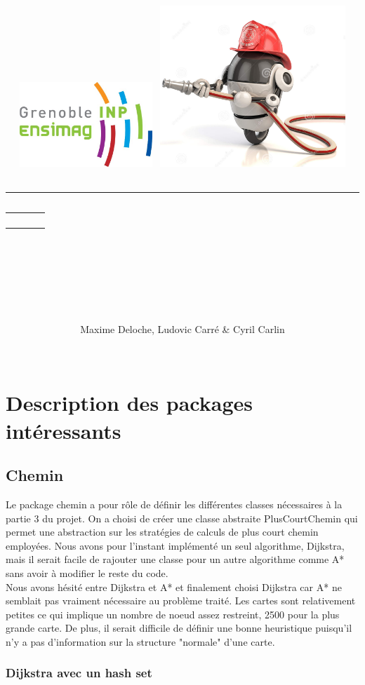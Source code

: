 \documentclass[12pt,a4paper]{article}
\title{
	\begin{flushleft}
		\includegraphics[width=5cm]{rapport/logo_ensimag.jpg} \hfill
		\includegraphics[width=7cm]{rapport/firebot.jpg} \\[40pt]
	\end{flushleft} 
	{\rule{15cm}{1mm}}\vspace{7mm}
	\begin{tabular}{p{4cm} r}
		& {\Huge {\bf \typedeprojet}} \\[20pt]
		& {\huge \nomduprojet}
	\end{tabular}\\
	\vspace{7mm}{\rule{15cm}{1mm}}\vspace{2mm} \\
	\hfill \large \dateduprojet \hspace{2cm}
	\renewcommand{\contentsname}{\LARGE \it Sommaire \hfill} %
	\setcounter{tocdepth}{2} %
	\tableofcontents
	\vfill
}
\author{
	\begin{tabular}{p{15cm}}
		\Large Maxime Deloche, Ludovic Carré \& Cyril Carlin
	\end{tabular} \\
	\hline
}
\date{}
\begin{document}
\maketitle
\thispagestyle{empty} %
\newpage



\section{Description des packages intéressants}

\subsection{Chemin}

Le package chemin a pour rôle de définir les différentes classes nécessaires à la partie 3 du projet. On a choisi de créer une classe abstraite PlusCourtChemin qui permet une abstraction sur les stratégies de calculs de plus court chemin employées. Nous avons pour l'instant implémenté un seul algorithme, Dijkstra, mais il serait facile de rajouter une classe pour un autre algorithme comme A* sans avoir à modifier le reste du code.\\

Nous avons hésité entre Dijkstra et A* et finalement choisi Dijkstra car A* ne semblait pas vraiment nécessaire au problème traité. Les cartes sont relativement petites ce qui implique un nombre de noeud assez restreint, 2500 pour la plus grande carte. De plus, il serait difficile de définir une bonne heuristique puisqu'il n'y a pas d'information sur la structure "normale" d'une carte.

\subsubsection{Dijkstra avec un hash set}
\end{document}
